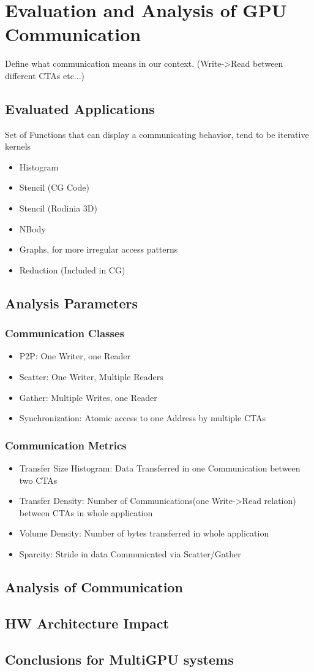 \chapter{Evaluation and Analysis of GPU Communication}\label{eval}
Define what communication means in our context. (Write->Read between different CTAs etc...)
\section{Evaluated Applications}
	Set of Functions that can display a communicating behavior, tend to be iterative kernels
\begin{itemize}
	\item Histogram
	\item Stencil (CG Code)
	\item Stencil (Rodinia 3D)
	\item NBody
	\item Graphs, for more irregular access patterns
	\item Reduction (Included in CG)
\end{itemize}
\section{Analysis Parameters}
\subsection{Communication Classes}
\begin{itemize}
	\item P2P: One Writer, one Reader
	\item Scatter: One Writer, Multiple Readers
	\item Gather: Multiple Writes, one Reader
	\item Synchronization: Atomic access to one Address by multiple CTAs
\end{itemize}
\subsection{Communication Metrics}
\begin{itemize}
	\item Transfer Size Histogram: Data Transferred in one Communication between two CTAs
	\item Transfer Density: Number of Communications(one Write->Read relation) between CTAs in whole application
	\item Volume Density: Number of bytes transferred in whole application
	\item Sparcity: Stride in data Communicated via Scatter/Gather
\end{itemize}
\section{Analysis of Communication}
\section{HW Architecture Impact}
\section{Conclusions for MultiGPU systems}